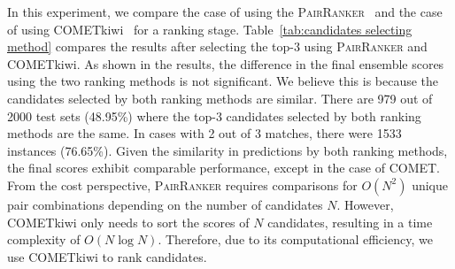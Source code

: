 In this experiment, we compare the case of using the \textsc{PairRanker}~\cite{llm-blender} and the case of using COMETkiwi~\cite{rei2022cometkiwi} for a ranking stage.
Table~\ref{tab:candidates selecting method} compares the results after selecting the top-3 using \textsc{PairRanker} and COMETkiwi.
As shown in the results, the difference in the final ensemble scores using the two ranking methods is not significant.
We believe this is because the candidates selected by both ranking methods are similar.
There are 979 out of 2000 test sets (48.95\%) where the top-3 candidates selected by both ranking methods are the same. 
In cases with 2 out of 3 matches, there were 1533 instances (76.65\%).
Given the similarity in predictions by both ranking methods, the final scores exhibit comparable performance, except in the case of COMET.
From the cost perspective, \textsc{PairRanker} requires comparisons for $O(N^2)$ unique pair combinations depending on the number of candidates $N$.
However, COMETkiwi only needs to sort the scores of $N$ candidates, resulting in a time complexity of $O(N\log N)$.
Therefore, due to its computational efficiency, we use COMETkiwi to rank candidates.


